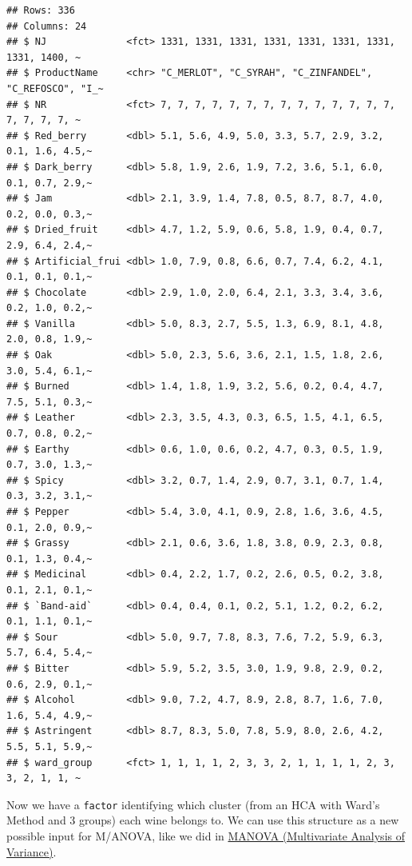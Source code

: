 \documentclass[
]{book}
\begin{document}
\begin{verbatim}
## Rows: 336
## Columns: 24
## $ NJ              <fct> 1331, 1331, 1331, 1331, 1331, 1331, 1331, 1331, 1400, ~
## $ ProductName     <chr> "C_MERLOT", "C_SYRAH", "C_ZINFANDEL", "C_REFOSCO", "I_~
## $ NR              <fct> 7, 7, 7, 7, 7, 7, 7, 7, 7, 7, 7, 7, 7, 7, 7, 7, 7, 7, ~
## $ Red_berry       <dbl> 5.1, 5.6, 4.9, 5.0, 3.3, 5.7, 2.9, 3.2, 0.1, 1.6, 4.5,~
## $ Dark_berry      <dbl> 5.8, 1.9, 2.6, 1.9, 7.2, 3.6, 5.1, 6.0, 0.1, 0.7, 2.9,~
## $ Jam             <dbl> 2.1, 3.9, 1.4, 7.8, 0.5, 8.7, 8.7, 4.0, 0.2, 0.0, 0.3,~
## $ Dried_fruit     <dbl> 4.7, 1.2, 5.9, 0.6, 5.8, 1.9, 0.4, 0.7, 2.9, 6.4, 2.4,~
## $ Artificial_frui <dbl> 1.0, 7.9, 0.8, 6.6, 0.7, 7.4, 6.2, 4.1, 0.1, 0.1, 0.1,~
## $ Chocolate       <dbl> 2.9, 1.0, 2.0, 6.4, 2.1, 3.3, 3.4, 3.6, 0.2, 1.0, 0.2,~
## $ Vanilla         <dbl> 5.0, 8.3, 2.7, 5.5, 1.3, 6.9, 8.1, 4.8, 2.0, 0.8, 1.9,~
## $ Oak             <dbl> 5.0, 2.3, 5.6, 3.6, 2.1, 1.5, 1.8, 2.6, 3.0, 5.4, 6.1,~
## $ Burned          <dbl> 1.4, 1.8, 1.9, 3.2, 5.6, 0.2, 0.4, 4.7, 7.5, 5.1, 0.3,~
## $ Leather         <dbl> 2.3, 3.5, 4.3, 0.3, 6.5, 1.5, 4.1, 6.5, 0.7, 0.8, 0.2,~
## $ Earthy          <dbl> 0.6, 1.0, 0.6, 0.2, 4.7, 0.3, 0.5, 1.9, 0.7, 3.0, 1.3,~
## $ Spicy           <dbl> 3.2, 0.7, 1.4, 2.9, 0.7, 3.1, 0.7, 1.4, 0.3, 3.2, 3.1,~
## $ Pepper          <dbl> 5.4, 3.0, 4.1, 0.9, 2.8, 1.6, 3.6, 4.5, 0.1, 2.0, 0.9,~
## $ Grassy          <dbl> 2.1, 0.6, 3.6, 1.8, 3.8, 0.9, 2.3, 0.8, 0.1, 1.3, 0.4,~
## $ Medicinal       <dbl> 0.4, 2.2, 1.7, 0.2, 2.6, 0.5, 0.2, 3.8, 0.1, 2.1, 0.1,~
## $ `Band-aid`      <dbl> 0.4, 0.4, 0.1, 0.2, 5.1, 1.2, 0.2, 6.2, 0.1, 1.1, 0.1,~
## $ Sour            <dbl> 5.0, 9.7, 7.8, 8.3, 7.6, 7.2, 5.9, 6.3, 5.7, 6.4, 5.4,~
## $ Bitter          <dbl> 5.9, 5.2, 3.5, 3.0, 1.9, 9.8, 2.9, 0.2, 0.6, 2.9, 0.1,~
## $ Alcohol         <dbl> 9.0, 7.2, 4.7, 8.9, 2.8, 8.7, 1.6, 7.0, 1.6, 5.4, 4.9,~
## $ Astringent      <dbl> 8.7, 8.3, 5.0, 7.8, 5.9, 8.0, 2.6, 4.2, 5.5, 5.1, 5.9,~
## $ ward_group      <fct> 1, 1, 1, 1, 2, 3, 3, 2, 1, 1, 1, 1, 2, 3, 3, 2, 1, 1, ~
\end{verbatim}

Now we have a \texttt{factor} identifying which cluster (from an HCA with Ward's Method and 3 groups) each wine belongs to. We can use this structure as a new possible input for M/ANOVA, like we did in \hyperref[manova-multivariate-analysis-of-variance]{MANOVA (Multivariate Analysis of Variance)}.
\end{document}
